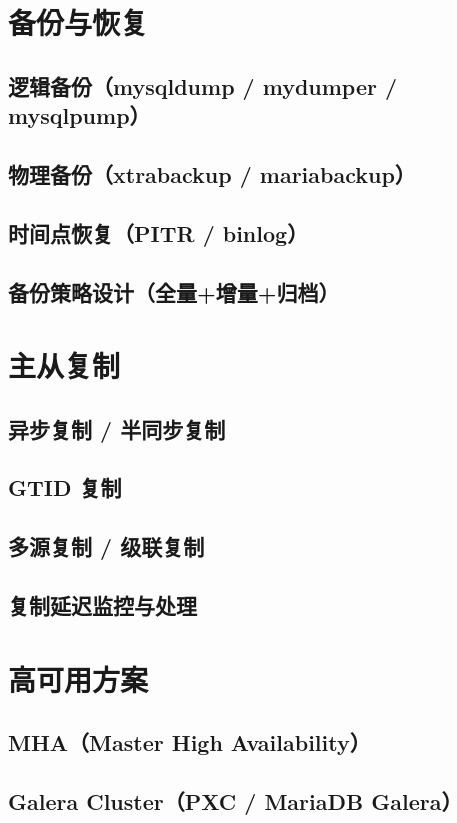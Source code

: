 \documentclass[12pt,UTF8]{ctexbook}
\begin{document}
  \section{备份与恢复}
    \subsection{逻辑备份（mysqldump / mydumper / mysqlpump）}
    \subsection{物理备份（xtrabackup / mariabackup）}
    \subsection{时间点恢复（PITR / binlog）}
    \subsection{备份策略设计（全量+增量+归档）}

  \section{主从复制}
    \subsection{异步复制 / 半同步复制}
    \subsection{GTID 复制}
    \subsection{多源复制 / 级联复制}
    \subsection{复制延迟监控与处理}

  \section{高可用方案}
    \subsection{MHA（Master High Availability）}
    \subsection{Galera Cluster（PXC / MariaDB Galera）}
\end{document}
